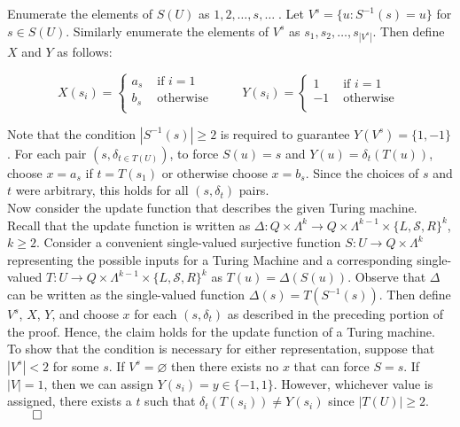 \documentclass[11pt]{article}
\let\emptyset\varnothing
\begin{document}
Enumerate the elements of $ S(U) $ as $ 1, 2, \dots, s, \dots \; $. Let $ V^s = \{u : S^{-1}(s) = u \} $ for $ s \in S(U) $. Similarly enumerate the elements of $ V^s $ as $ s_1, s_2, \dots , s_{|V^{s}|}$. Then define $ X $ and $ Y $ as follows:

\begin{equation*}
X(s_i) = \begin{cases}
       a_s & \text{ if } i = 1 \\
       b_s & \text{ otherwise } \\
       \end{cases} \quad \quad 
Y(s_i) = \begin{cases}
       1 & \text{ if } i = 1 \\
       -1 & \text{ otherwise } \\
       \end{cases} 
\end{equation*}

\bigskip
Note that the condition $ |S^{-1}(s)| \geq 2 $ is required to guarantee $ Y(V^s) = \{1, -1\} $. For each pair $ (s, \delta_{t \in T(U)} ) $, to force $ S(u) = s $ and $ Y(u) = \delta_{t}(T(u)) $, choose $ x = a_s $ if $ t = T(s_1) $ or otherwise choose $ x = b_s $. Since the choices of $ s $ and $ t $ were arbitrary, this holds for all $ (s, \delta_t) $ pairs. \\

Now consider the update function that describes the given Turing machine. Recall that the update function is written as $ \Delta: Q \times \Lambda^{k} \rightarrow Q \times \Lambda^{k - 1} \times \{ L, \mathcal{S}, R \} ^{k} $, $ k \geq 2 $. Consider a convenient single-valued surjective function $ S: U \rightarrow Q \times \Lambda^{k} $ representing the possible inputs for a Turing Machine and a corresponding single-valued $ T: U \rightarrow Q \times \Lambda^{k - 1} \times \{ L, \mathcal{S}, R \}^ {k} $ as $ T(u) = \Delta(S(u)) $. Observe that $ \Delta $ can be written as the single-valued function $ \Delta(s) = T(S^{-1}(s)) $. Then define $ V^s $, $ X $, $ Y $, and choose $ x $ for each $ (s, \delta_t ) $ as described in the preceding portion of the proof. Hence, the claim holds for the update function of a Turing machine.\\

To show that the condition is necessary for either representation, suppose that $|V^s| < 2$ for some $ s $. If $ V^s = \emptyset $ then there exists no $ x $ that can force $ S = s $. If $ |V| = 1 $, then we can assign $ Y(s_i) = y \in \{-1, 1\} $. However, whichever value is assigned, there exists a $ t $ such that $ \delta_{t}(T(s_i)) \neq Y(s_i) $ since $ |T(U)| \geq 2 $. $ \hfill \qed $ \\
\end{document}
